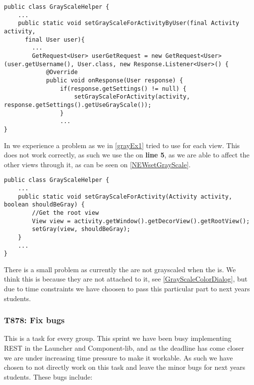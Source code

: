 \begin{minipage}[H]{\linewidth}
\begin{lstlisting}[caption = Finds the grayscale setting for each user, label =
NEWsetGrayScaleUser] 
public class GrayScaleHelper {
	...
	public static void setGrayScaleForActivityByUser(final Activity activity, 
	  final User user){
		...
		GetRequest<User> userGetRequest = new GetRequest<User>(user.getUsername(), User.class, new Response.Listener<User>() {
            @Override
            public void onResponse(User response) {
           		if(response.getSettings() != null) {
               		setGrayScaleForActivity(activity, response.getSettings().getUseGrayScale());
               	}
	 			...
}
\end{lstlisting}
\end{minipage}

In  we experience a problem as we in
\autoref{grayEx1} tried to use  for each view. This does not work
correctly, as such we use the  on \textbf{line
5}, as we are able to affect the other views through it, as can be seen on
\autoref{NEWsetGrayScale}.

\begin{minipage}[H]{\linewidth}
\begin{lstlisting}[caption = The root View is used instead of all the seperate
views, label = NEWsetGrayScale] public class GrayScaleHelper {
	...
    public static void setGrayScaleForActivity(Activity activity, boolean shouldBeGray) {
        //Get the root view
        View view = activity.getWindow().getDecorView().getRootView();
        setGray(view, shouldBeGray);
    }
    ...
}
\end{lstlisting}
\end{minipage}

There is a small problem as currently the  are not grayscaled
when the  is. We think this is because they are not attached to
it, see \autoref{GrayScaleColorDialog}, but due to time constraints we have
choosen to pass this particular part to next years students. 


\subsubsection{T878: Fix bugs}
This is a task for every group. This sprint we have been busy implementing REST
in the Launcher and Component-lib, and as the deadline has come closer we are
under increasing time pressure to make it workable. As such we have chosen to
not directly work on this task and leave the minor bugs for next years students.
These bugs include:

